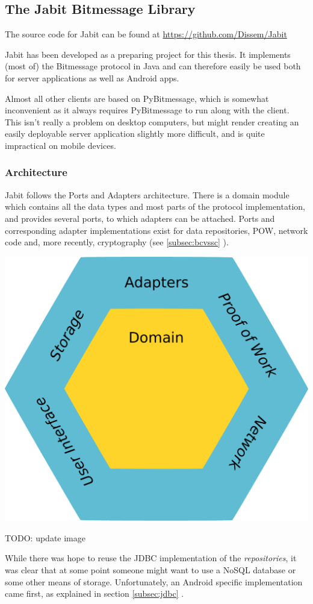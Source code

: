 \documentclass{bfh}
\begin{document}
  \subsection{The Jabit Bitmessage Library}
  The source code for Jabit can be found at \url{https://github.com/Dissem/Jabit}

  Jabit has been developed as a preparing project for this thesis. It implements (most of) the Bitmessage protocol in Java and can therefore easily be used both for server applications as well as Android apps.

  Almost all other clients are based on PyBitmessage, which is somewhat inconvenient as it always requires PyBitmessage to run along with the client. This isn't really a problem on desktop computers, but might render creating  an easily deployable server application slightly more difficult, and is quite impractical on mobile devices.


  \subsubsection{Architecture}
  Jabit follows the Ports and Adapters architecture. There is a domain module which contains all the data types and most parts of the protocol implementation, and provides several ports, to which adapters can be attached. Ports and corresponding adapter implementations exist for data repositories, \ac{POW}, network code and, more recently, cryptography (see \ref{subsec:bcvssc} ).

  \begin{center}
    \includegraphics[width=0.5 \textwidth]{images/ports_and_adapters.pdf}
  \end{center}

TODO: update image

  While there was hope to reuse the \acs{JDBC} implementation of the \textit{repositories}, it was clear that at some point someone might want to use a \acs{NoSQL} database or some other means of storage. Unfortunately, an Android specific implementation came first, as explained in section \ref{subsec:jdbc} .
\end{document}
